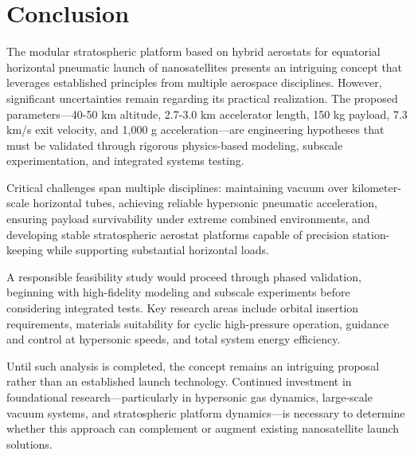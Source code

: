 \section{Conclusion}
\label{sec:conclusion}

The modular stratospheric platform based on hybrid aerostats for equatorial horizontal pneumatic launch of nanosatellites presents an intriguing concept that leverages established principles from multiple aerospace disciplines. However, significant uncertainties remain regarding its practical realization. The proposed parameters—40-50 km altitude, 2.7-3.0 km accelerator length, 150 kg payload, 7.3 km/s exit velocity, and 1,000 g acceleration—are engineering hypotheses that must be validated through rigorous physics-based modeling, subscale experimentation, and integrated systems testing.

Critical challenges span multiple disciplines: maintaining vacuum over kilometer-scale horizontal tubes, achieving reliable hypersonic pneumatic acceleration, ensuring payload survivability under extreme combined environments, and developing stable stratospheric aerostat platforms capable of precision station-keeping while supporting substantial horizontal loads.

A responsible feasibility study would proceed through phased validation, beginning with high-fidelity modeling and subscale experiments before considering integrated tests. Key research areas include orbital insertion requirements, materials suitability for cyclic high-pressure operation, guidance and control at hypersonic speeds, and total system energy efficiency.

Until such analysis is completed, the concept remains an intriguing proposal rather than an established launch technology. Continued investment in foundational research—particularly in hypersonic gas dynamics, large-scale vacuum systems, and stratospheric platform dynamics—is necessary to determine whether this approach can complement or augment existing nanosatellite launch solutions.

\printbibliography

